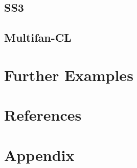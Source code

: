 \documentclass[a4paper, 11pt, oldtoc]{artikel1}
\begin{document}
\subsection*{SS3}
\subsection*{Multifan-CL}

\section*{Further Examples}


\section*{References}

\section*{Appendix}
\end{document}
